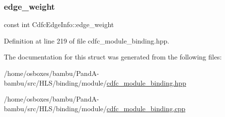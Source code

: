 \subsubsection{\texorpdfstring{edge\+\_\+weight}{edge\_weight}}
{\footnotesize\ttfamily const int Cdfc\+Edge\+Info\+::edge\+\_\+weight}



Definition at line 219 of file cdfc\+\_\+module\+\_\+binding.\+hpp.



The documentation for this struct was generated from the following files\+:\begin{DoxyCompactItemize}
\item 
/home/osboxes/bambu/\+Pand\+A-\/bambu/src/\+H\+L\+S/binding/module/\hyperlink{cdfc__module__binding_8hpp}{cdfc\+\_\+module\+\_\+binding.\+hpp}\item 
/home/osboxes/bambu/\+Pand\+A-\/bambu/src/\+H\+L\+S/binding/module/\hyperlink{cdfc__module__binding_8cpp}{cdfc\+\_\+module\+\_\+binding.\+cpp}\end{DoxyCompactItemize}
